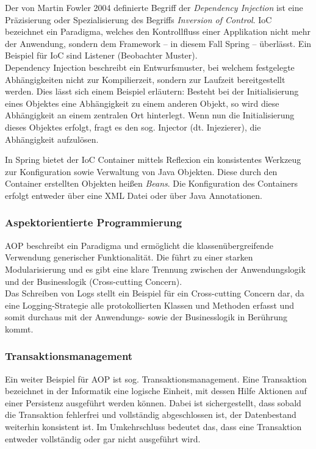 				Der von Martin Fowler 2004 definierte Begriff der \textit{Dependency Injection} ist eine Präzisierung oder Spezialisierung des Begriffs \textit{Inversion of Control}. IoC bezeichnet ein Paradigma, welches den Kontrollfluss einer Applikation nicht mehr der Anwendung, sondern dem Framework -- in diesem Fall Spring -- überlässt. Ein Beispiel für IoC sind Listener (Beobachter Muster). \\
				Dependency Injection beschreibt ein Entwurfsmuster, bei welchem festgelegte Abhängigkeiten nicht zur Kompilierzeit, sondern zur Laufzeit bereitgestellt werden. Dies lässt sich einem Beispiel erläutern: Besteht bei der Initialisierung eines Objektes eine Abhängigkeit zu einem anderen Objekt, so wird diese Abhängigkeit an einem zentralen Ort hinterlegt. Wenn nun die Initialisierung dieses Objektes erfolgt, fragt es den sog. Injector (dt. Injezierer), die Abhängigkeit aufzulösen. \cite{MartinFowler.23.01.2020}
					
				In Spring bietet der IoC Container mittels Reflexion ein konsistentes Werkzeug zur Konfiguration sowie Verwaltung von Java Objekten. Diese durch den Container erstellten Objekten heißen \textit{Beans}. Die Konfiguration des Containers erfolgt entweder über eine XML Datei oder über Java Annotationen. \cite{Walls.20162017} 
				
			\subsubsection{Aspektorientierte Programmierung}
			
				AOP beschreibt ein Paradigma und ermöglicht die klassenübergreifende Verwendung generischer Funktionalität. Die führt zu einer starken Modularisierung und es gibt eine klare Trennung zwischen der Anwendungslogik und der Businesslogik (Cross-cutting Concern). \cite{Wunderlich.2005} \\
				Das Schreiben von Logs stellt ein Beispiel für ein Cross-cutting Concern dar, da eine Logging-Strategie alle protokollierten Klassen und Methoden erfasst und somit durchaus mit der Anwendungs- sowie der Businesslogik in Berührung kommt. 
				
			\subsubsection{Transaktionsmanagement} %
			
				Ein weiter Beispiel für AOP ist sog. Transaktionsmanagement. Eine Transaktion bezeichnet in der Informatik eine logische Einheit, mit dessen Hilfe Aktionen auf einer Persistenz ausgeführt werden können. Dabei ist sichergestellt, dass sobald die Transaktion fehlerfrei und vollständig abgeschlossen ist, der Datenbestand weiterhin konsistent ist. Im Umkehrschluss bedeutet das, dass eine Transaktion entweder vollständig oder gar nicht ausgeführt wird. \cite{Ozsu.2011}
					
